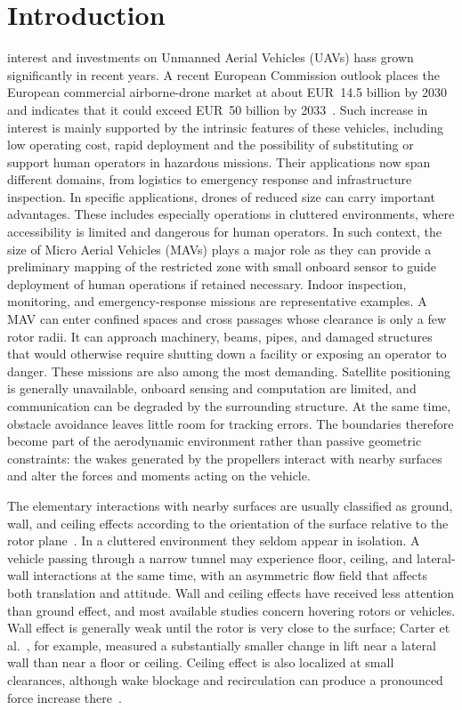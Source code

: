 \documentclass[journal]{IEEEtran}
\begin{document}
\IEEEpeerreviewmaketitle

\section{Introduction}
\label{Introduction}
 interest and investments on Unmanned Aerial Vehicles (UAVs) hass grown significantly in recent years. A recent European Commission outlook places the European commercial airborne-drone market at about EUR~14.5 billion by 2030 and indicates that it could exceed EUR~50 billion by 2033~\cite{EuropeanCommission2026}. Such increase in interest is mainly supported by the intrinsic features of these vehicles, including low operating cost, rapid deployment and the possibility of substituting or support human operators in hazardous missions. Their applications now span different domains, from logistics to emergency response and infrastructure inspection. In specific applications, drones of reduced size can carry important advantages. These includes especially operations in cluttered environments, where accessibility is limited and dangerous for human operators. In such context, the size of Micro Aerial Vehicles (MAVs) plays a major role as they can provide a preliminary mapping of the restricted zone with small onboard sensor to guide deployment of human operations if retained necessary.   
Indoor inspection, monitoring, and emergency-response missions are representative examples. A MAV can enter confined spaces and cross passages whose clearance is only a few rotor radii. It can approach machinery, beams, pipes, and damaged structures that would otherwise require shutting down a facility or exposing an operator to danger. These missions are also among the most demanding. Satellite positioning is generally unavailable, onboard sensing and computation are limited, and communication can be degraded by the surrounding structure. At the same time, obstacle avoidance leaves little room for tracking errors. The boundaries therefore become part of the aerodynamic environment rather than passive geometric constraints: the wakes generated by the propellers interact with nearby surfaces and alter the forces and moments acting on the vehicle.

The elementary interactions with nearby surfaces are usually classified as ground, wall, and ceiling effects according to the orientation of the surface relative to the rotor plane~\cite{Matus2020,Carter2021,Franzetti2024}. In a cluttered environment they seldom appear in isolation. A vehicle passing through a narrow tunnel may experience floor, ceiling, and lateral-wall interactions at the same time, with an asymmetric flow field that affects both translation and attitude. Wall and ceiling effects have received less attention than ground effect, and most available studies concern hovering rotors or vehicles. Wall effect is generally weak until the rotor is very close to the surface; Carter et al.~\cite{Carter2021}, for example, measured a substantially smaller change in lift near a lateral wall than near a floor or ceiling. Ceiling effect is also localized at small clearances, although wake blockage and recirculation can produce a pronounced force increase there~\cite{Franzetti2024,Cai2024}.
\end{document}
